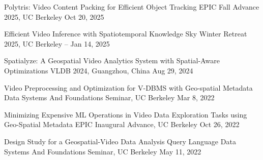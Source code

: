 

\begin{cvpubs}

  \cvpub
    {Polytris: Video Content Packing for Efficient Object Tracking} %
    {EPIC Fall Advance 2025, UC Berkeley} %
    {Oct 20, 2025} %
    {} %

  \cvpub
    {Efficient Video Inference with Spatiotemporal Knowledge} %
    {Sky Winter Retreat 2025, UC Berkeley -- \href{https://youtu.be/FaE254pkr1c}{\underline{}}} %
    {Jan 14, 2025} %
    {} %

  \cvpub
    {Spatialyze: A Geospatial Video Analytics System with Spatial-Aware Optimizations} %
    {VLDB 2024, Guangzhou, China} %
    {Aug 29, 2024} %
    {} %


  \cvpub
    {Video Preprocessing and Optimization for V-DBMS with Geo-spatial Metadata} %
    {Data Systems And Foundations Seminar, UC Berkeley} %
    {Mar 8, 2022} %
    {} %

  \cvpub
    {Minimizing Expensive ML Operations in Video Data Exploration Tasks using Geo-Spatial Metadata} %
    {EPIC Inaugural Advance, UC Berkeley} %
    {Oct 26, 2022} %
    {} %

  \cvpub
    {Design Study for a Geospatial-Video Data Analysis Query Language} %
    {Data Systems And Foundations Seminar, UC Berkeley} %
    {May 11, 2022} %
    {} %


\end{cvpubs}
